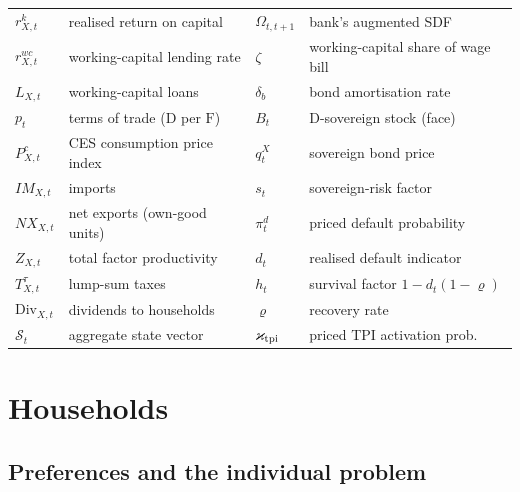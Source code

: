 \documentclass[11pt]{article}
\numberwithin{equation}{section}
\newcommand{\D}{\mathrm{D}}
\newcommand{\F}{\mathrm{F}}
\theoremstyle{definition}
\theoremstyle{plain}
\theoremstyle{remark}
\begin{document}
\begin{table}[htbp]
\begin{tabular}{@{}ll@{\qquad}ll@{}}
$r^{k}_{X,t}$    & realised return on capital           & $\Omega_{t,t+1}$  & bank's augmented SDF\\
$r^{wc}_{X,t}$   & working-capital lending rate         & $\zeta$         & working-capital share of wage bill\\
$L_{X,t}$        & working-capital loans                & $\delta_b$      & bond amortisation rate\\
$p_{t}$          & terms of trade ($\D$ per $\F$)       & $B_{t}$         & $\D$-sovereign stock (face)\\
$P^{c}_{X,t}$    & CES consumption price index          & $q^{X}_{t}$     & sovereign bond price\\
$IM_{X,t}$       & imports                              & $s_{t}$         & sovereign-risk factor\\
$NX_{X,t}$       & net exports (own-good units)         & $\pi^{d}_{t}$   & priced default probability\\
$Z_{X,t}$        & total factor productivity            & $d_{t}$         & realised default indicator\\
$T^{\tau}_{X,t}$ & lump-sum taxes                       & $h_{t}$         & survival factor $1-d_t(1-\varrho)$\\
$\mathrm{Div}_{X,t}$ & dividends to households          & $\varrho$       & recovery rate\\
$\mathcal{S}_t$  & aggregate state vector               & $\varkappa_{\rm tpi}$ & priced TPI activation prob.\\
\bottomrule
\end{tabular}
\end{table}

\section{Households}

\subsection{Preferences and the individual problem}
\end{document}
